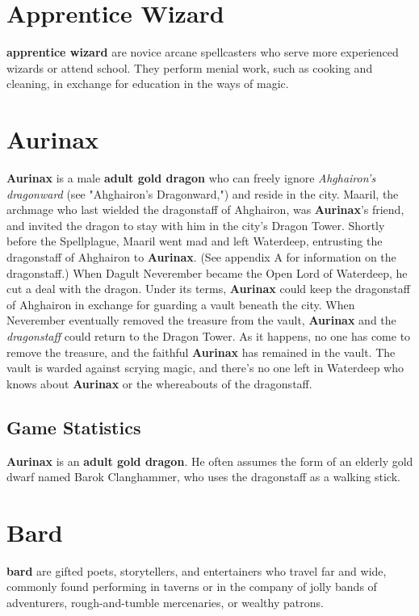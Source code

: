 \documentclass[10pt,a4paper,twoside,twocolumn,openany,nodeprecatedcode]{dndbook}
\begin{document}
\section{Apprentice Wizard}
\textbf{apprentice wizard} are novice arcane spellcasters who  serve more experienced wizards or attend school. They  perform menial work, such as cooking and cleaning, in  exchange for education in the ways of magic.
\section{Aurinax}
\textbf{Aurinax} is a male \textbf{adult gold dragon} who can freely ignore \textit{Ahghairon's dragonward} (see "Ahghairon's Dragonward,") and reside in the city. Maaril, the archmage who last wielded the dragonstaff of Ahghairon, was \textbf{Aurinax}'s friend, and invited the dragon to stay with him in the city's Dragon Tower. Shortly before the Spellplague, Maaril went mad and left Waterdeep, entrusting the dragonstaff of Ahghairon to \textbf{Aurinax}. (See appendix A for information on the dragonstaff.)
When Dagult Neverember became the Open Lord of Waterdeep, he cut a deal with the dragon. Under its terms, \textbf{Aurinax} could keep the dragonstaff of Ahghairon in exchange for guarding a vault beneath the city. When Neverember eventually removed the treasure from the vault, \textbf{Aurinax} and the \textit{dragonstaff} could return to the Dragon Tower.
As it happens, no one has come to remove the treasure, and the faithful \textbf{Aurinax} has remained in the vault. The vault is warded against scrying magic, and there's no one left in Waterdeep who knows about \textbf{Aurinax} or the whereabouts of the dragonstaff.
\subsection{Game Statistics}
\textbf{Aurinax} is an \textbf{adult gold dragon}. He often assumes the form of an elderly gold dwarf named Barok Clanghammer, who uses the dragonstaff as a walking stick.
\section{Bard}
\textbf{bard} are gifted poets, storytellers, and entertainers  who travel far and wide, commonly found performing in  taverns or in the company of jolly bands of adventurers,  rough-and-tumble mercenaries, or wealthy patrons.
\end{document}
